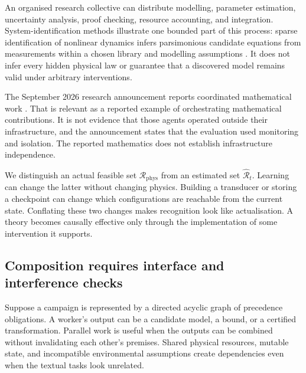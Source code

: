 \documentclass[11pt,a4paper]{article}
\theoremstyle{definition}
\theoremstyle{remark}
\begin{document}
An organised research collective can distribute modelling, parameter estimation, uncertainty analysis, proof checking, resource accounting, and integration. System-identification methods illustrate one bounded part of this process: sparse identification of nonlinear dynamics infers parsimonious candidate equations from measurements within a chosen library and modelling assumptions \citep{sindy}. It does not infer every hidden physical law or guarantee that a discovered model remains valid under arbitrary interventions.

The September 2026 research announcement reports coordinated mathematical work \citep{openaiannounce}. That is relevant as a reported example of orchestrating mathematical contributions. It is not evidence that those agents operated outside their infrastructure, and the announcement states that the evaluation used monitoring and isolation. The reported mathematics does not establish infrastructure independence.

We distinguish an actual feasible set $\mathscr R_{\mathrm{phys}}$ from an estimated set $\widehat{\mathscr R}_t$. Learning can change the latter without changing physics. Building a transducer or storing a checkpoint can change which configurations are reachable from the current state. Conflating these two changes makes recognition look like actualisation. A theory becomes causally effective only through the implementation of some intervention it supports.

\subsection{Composition requires interface and interference checks}
Suppose a campaign is represented by a directed acyclic graph of precedence obligations. A worker's output can be a candidate model, a bound, or a certified transformation. Parallel work is useful when the outputs can be combined without invalidating each other's premises. Shared physical resources, mutable state, and incompatible environmental assumptions create dependencies even when the textual tasks look unrelated.
\end{document}

